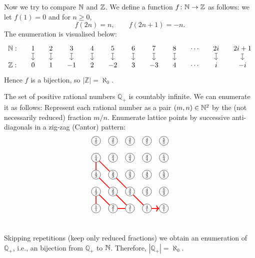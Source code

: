 


\begin{example}
  Now we try to compare $\mathbb{N}$ and $\mathbb{Z}$. We define a function \(f\colon \mathbb{N}\to \mathbb{Z}\) as follows:
  we let \(f(1)=0\) and for \(n\ge 0\),
  \[
  f(2n)=n,\qquad f(2n+1)=-n.
  \]
  The enumeration is visualised below:
  \[
  \begin{tikzcd}[row sep=small, column sep=1.2em, ampersand replacement=\&]
  \N: \& 1 \arrow[d,mapsto] \& 2 \arrow[d,mapsto] \& 3 \arrow[d,mapsto] \& 4 \arrow[d,mapsto] \& 5 \arrow[d,mapsto] \& 6 \arrow[d,mapsto] \& 7 \arrow[d,mapsto] \& 8 \arrow[d,mapsto] \& \cdots \& 2i \arrow[d,mapsto] \& 2i+1 \arrow[d,mapsto] \\
  \mathbb{Z}: \& 0 \& 1 \& -1 \& 2 \& -2 \& 3 \& -3 \& 4 \& \cdots \& i \& -i
  \end{tikzcd}
  \]
  Hence \(f\) is a bijection, so \(|\mathbb{Z}|=\aleph_0\).
\end{example}

\begin{example}
  The set of positive rational numbers \(\mathbb{Q}_{+}\) is countably infinite. We can enumerate it as follows:
  Represent each rational number as a pair $(m,n)\in\mathbb{N}^2$ by the (not necessarily reduced) fraction $m/n$.  
  Enumerate lattice points by successive anti-diagonals in a zig‑zag (Cantor) pattern:
  \[
  \begin{tikzpicture}[scale=.85,baseline={(0,0)}]
  \foreach \x in {1,...,5}{
    \foreach \y in {1,...,5}{
      \node[circle,inner sep=1pt,draw] (p-\x-\y) at (\x,\y) {\scriptsize $\frac{\x}{\y}$};
    }
  }
  \draw[very thick,red,->] (p-1-1)--(p-1-2)--(p-2-1)--(p-3-1)--(p-2-2)--(p-1-3)--(p-1-4)--(p-2-3)--(p-3-2)--(p-4-1)--(p-5-1);
  \end{tikzpicture}
  \]
  Skipping repetitions (keep only reduced fractions) we obtain an enumeration of $\mathbb{Q}_{+}$, i.e., an bijection from $\mathbb{Q}_{+}$ to $\mathbb{N}$. Therefore, $|\mathbb{Q}_{+}|=\aleph_0$.
\end{example}



